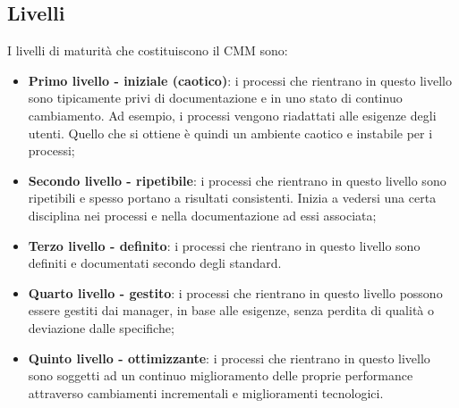 \documentclass[PianoDiQualifica.tex]{subfiles}
\begin{document}
	\subsection{Livelli}
	I livelli di maturità che costituiscono il CMM sono:
	\begin{itemize}
		\item \textbf{Primo livello - iniziale (caotico)}: i processi che rientrano in questo livello sono tipicamente privi di documentazione e in uno stato di
		continuo cambiamento. Ad esempio, i processi vengono riadattati alle esigenze degli utenti. Quello che si ottiene è quindi un
		ambiente caotico e instabile per i processi;
		\item \textbf{Secondo livello - ripetibile}:  i processi che rientrano in questo livello sono ripetibili e spesso portano a risultati consistenti.
		Inizia a vedersi una certa disciplina nei processi e nella documentazione ad essi associata;
		\item \textbf{Terzo livello - definito}: i processi che rientrano in questo livello sono definiti e documentati secondo degli standard.
		\item \textbf{Quarto livello - gestito}: i processi che rientrano in questo livello possono essere gestiti dai manager, in base alle esigenze, senza
		perdita di qualità o deviazione dalle specifiche;
		\item \textbf{Quinto livello - ottimizzante}: i processi che rientrano in questo livello sono soggetti ad un continuo miglioramento delle proprie
		performance attraverso cambiamenti incrementali e miglioramenti tecnologici.
	\end{itemize}
\end{document}
